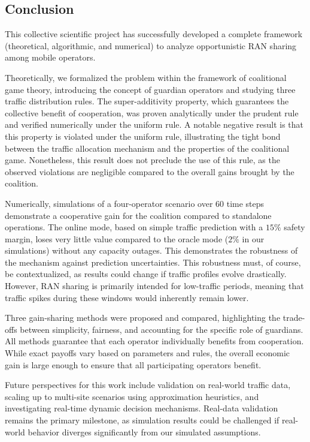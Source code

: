 \subsection{Conclusion}

This collective scientific project has successfully developed a complete framework (theoretical, algorithmic, and numerical) to analyze opportunistic RAN sharing among mobile operators.

Theoretically, we formalized the problem within the framework of coalitional game theory, introducing the concept of guardian operators and studying three traffic distribution rules. The super-additivity property, which guarantees the collective benefit of cooperation, was proven analytically under the prudent rule and verified numerically under the uniform rule. A notable negative result is that this property is violated under the uniform rule, illustrating the tight bond between the traffic allocation mechanism and the properties of the coalitional game. Nonetheless, this result does not preclude the use of this rule, as the observed violations are negligible compared to the overall gains brought by the coalition.

Numerically, simulations of a four-operator scenario over 60 time steps demonstrate a cooperative gain for the coalition compared to standalone operations. The online mode, based on simple traffic prediction with a $15\%$ safety margin, loses very little value compared to the oracle mode ($2\%$ in our simulations) without any capacity outages. This demonstrates the robustness of the mechanism against prediction uncertainties. This robustness must, of course, be contextualized, as results could change if traffic profiles evolve drastically. However, RAN sharing is primarily intended for low-traffic periods, meaning that traffic spikes during these windows would inherently remain lower.

Three gain-sharing methods were proposed and compared, highlighting the trade-offs between simplicity, fairness, and accounting for the specific role of guardians. All methods guarantee that each operator individually benefits from cooperation. While exact payoffs vary based on parameters and rules, the overall economic gain is large enough to ensure that all participating operators benefit.

Future perspectives for this work include validation on real-world traffic data, scaling up to multi-site scenarios using approximation heuristics, and investigating real-time dynamic decision mechanisms. Real-data validation remains the primary milestone, as simulation results could be challenged if real-world behavior diverges significantly from our simulated assumptions.
